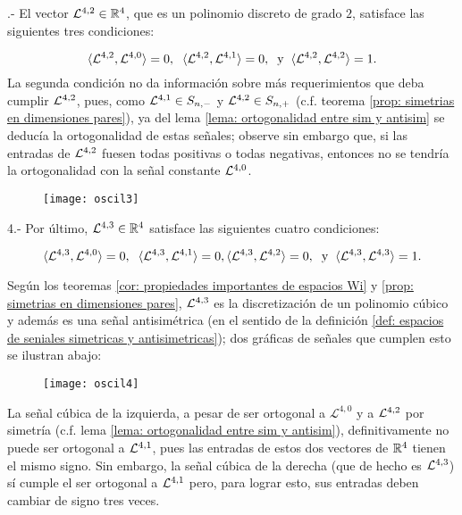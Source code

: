 .- El vector
$\mathcal{L}^{4,2} \in \mathbb{R}^{4}$,
que es un polinomio discreto
de grado $2$, satisface las siguientes
tres condiciones:

\[
\langle \mathcal{L}^{4,2} , \mathcal{L}^{4,0} \rangle=0,
\hspace{0.2cm}
\langle \mathcal{L}^{4,2} , \mathcal{L}^{4,1} \rangle=0,
\hspace{0.2cm} \text{y} \hspace{0.2cm}
\langle \mathcal{L}^{4,2} , \mathcal{L}^{4,2} \rangle=1.
\]
La segunda condición no da información sobre más
requerimientos que deba cumplir
$\mathcal{L}^{4,2}$, pues,
como $\mathcal{L}^{4,1} \in S_{n,-}$
y $\mathcal{L}^{4,2} \in S_{n,+}$
(c.f. teorema 
\ref{prop: simetrias en dimensiones pares}),
ya del lema
\ref{lema: ortogonalidad entre sim y antisim}
se deducía la ortogonalidad de estas señales; 
observe sin embargo que, si las entradas de 
$\mathcal{L}^{4,2}$ fuesen todas positivas o todas negativas,
entonces no se tendría la ortogonalidad
con la señal constante $\mathcal{L}^{4,0}$.


\begin{figure}[H]
\texttt{[image: oscil3]}
\end{figure}

4.- Por último, $\mathcal{L}^{4,3} \in \mathbb{R}^{4}$ satisface
las siguientes cuatro condiciones: 

\[
\langle \mathcal{L}^{4,3} , \mathcal{L}^{4,0} \rangle=0,
\hspace{0.2cm}
\langle \mathcal{L}^{4,3} , \mathcal{L}^{4,1} \rangle=0,
\langle \mathcal{L}^{4,3} , \mathcal{L}^{4,2} \rangle=0,
\hspace{0.2cm} \text{y} \hspace{0.2cm}
\langle \mathcal{L}^{4,3} , \mathcal{L}^{4,3} \rangle=1.
\]

Según los teoremas 
\ref{cor: propiedades importantes de espacios Wi}
y \ref{prop: simetrias en dimensiones pares},
$\mathcal{L}^{4,3}$ es la discretización de un polinomio
cúbico y además es una señal antisimétrica (en el sentido de la definición
\ref{def: espacios de seniales simetricas y antisimetricas}); dos gráficas de señales que cumplen esto se ilustran abajo:

\begin{figure}[H]
	\texttt{[image: oscil4]}
\end{figure}

La señal cúbica de la izquierda, a pesar de 
ser ortogonal a $\mathcal{L}^{4,0}$ y a $\mathcal{L}^{4,2}$ por 
simetría (c.f. lema
\ref{lema: ortogonalidad entre sim y antisim}), 
definitivamente no puede ser ortogonal
a $\mathcal{L}^{4,1}$, pues las entradas de estos dos vectores de 
$\mathbb{R}^{4}$ tienen el mismo signo. Sin embargo, la señal cúbica 
de la derecha (que de hecho es $\mathcal{L}^{4,3}$) sí cumple el ser
ortogonal a $\mathcal{L}^{4,1}$ pero, para lograr esto, sus
entradas deben cambiar de signo tres veces. \\


